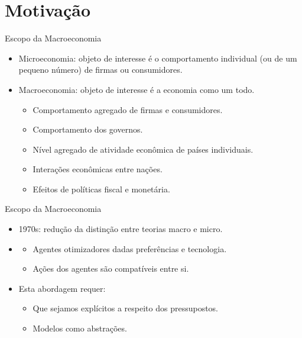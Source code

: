 \documentclass[10pt]{beamer}
\begin{document}
\section{Motivação}
\begin{frame}{Escopo da Macroeconomia}
    \begin{itemize}
        \item Microeconomia: objeto de interesse é o comportamento individual (ou de um pequeno número) de firmas ou consumidores. \bigskip
        \item Macroeconomia: objeto de interesse é a economia como um todo.\medskip
        \begin{itemize}
            \item Comportamento agregado de firmas e consumidores. \medskip
            \item Comportamento dos governos. \medskip
            \item Nível agregado de atividade econômica de países individuais. \medskip
            \item Interações econômicas entre nações. \medskip
            \item Efeitos de políticas fiscal e monetária.
        \end{itemize}
    \end{itemize}
\end{frame}

\begin{frame}{Escopo da Macroeconomia}
    \begin{itemize}
        \item 1970s: redução da distinção entre teorias macro e micro. \bigskip
        \item {} \medskip
        \begin{itemize}
            \item Agentes otimizadores dadas preferências e tecnologia. \medskip
            \item Ações dos agentes são compatíveis entre si. \medskip
        \end{itemize}
        \item Esta abordagem requer:\medskip
        \begin{itemize}
            \item Que sejamos explícitos a respeito dos pressupostos. \medskip
            \item Modelos como abstrações.
        \end{itemize}
    \end{itemize}
\end{frame}
\end{document}
